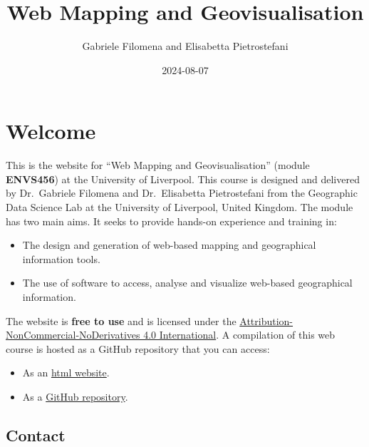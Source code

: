 \documentclass[
  letterpaper,
  DIV=11,
  numbers=noendperiod]{scrreprt}
\title{Web Mapping and Geovisualisation}
\author{Gabriele Filomena and Elisabetta Pietrostefani}
\date{2024-08-07}
\providecommand{\tightlist}{%
  \setlength{\itemsep}{0pt}\setlength{\parskip}{0pt}}\usepackage{longtable,booktabs,array}
\renewcommand*\contentsname{Table of contents}
\newcommand\contentsname{Table of contents}
\begin{document}
\maketitle

\renewcommand*\contentsname{Table of contents}
{
\hypersetup{linkcolor=}
\setcounter{tocdepth}{2}
\tableofcontents
}

\chapter*{Welcome}\label{welcome}


This is the website for ``Web Mapping and Geovisualisation'' (module
\textbf{ENVS456}) at the University of Liverpool. This course is
designed and delivered by Dr.~Gabriele Filomena and Dr.~Elisabetta
Pietrostefani from the Geographic Data Science Lab at the University of
Liverpool, United Kingdom. The module has two main aims. It seeks to
provide hands-on experience and training in:

\begin{itemize}
\tightlist
\item
  The design and generation of web-based mapping and geographical
  information tools.
\item
  The use of software to access, analyse and visualize web-based
  geographical information.
\end{itemize}

The website is \textbf{free to use} and is licensed under the
\href{https://creativecommons.org/licenses/by-nc-nd/4.0/}{Attribution-NonCommercial-NoDerivatives
4.0 International}. A compilation of this web course is hosted as a
GitHub repository that you can access:

\begin{itemize}
\tightlist
\item
  As an \href{https://gdsl-ul.github.io/wma}{html website}.
\item
  As a \href{https://github.com/GDSL-UL/wma}{GitHub repository}.
\end{itemize}

\section*{Contact}\label{contact}

\end{document}
